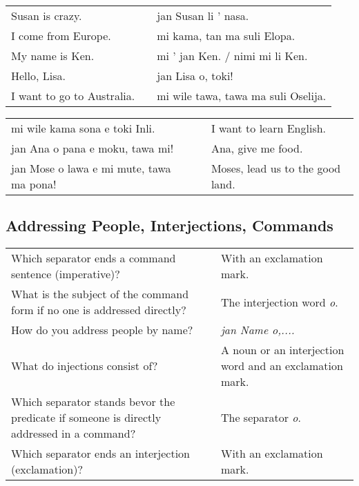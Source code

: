 \begin{supertabular}{p{5,5cm}|ll}
    Susan is crazy.            &  & jan Susan li ' nasa.                \\
    I come from Europe.        &  & mi kama, tan ma suli Elopa.         \\
    My name is Ken.            &  & mi ' jan Ken. / nimi mi li Ken.     \\
    Hello, Lisa.               &  & jan Lisa o, toki!                   \\
    I want to go to Australia. &  & mi wile tawa, tawa ma suli Oselija. \\
\end{supertabular}

\begin{supertabular}{p{5,5cm}|ll}
    mi wile kama sona e toki Inli.           &  & I want to learn English.         \\
    jan Ana o pana e moku, tawa mi!          &  & Ana, give me food.               \\
    jan Mose o lawa e mi mute, tawa ma pona! &  & Moses, lead us to the good land. \\
\end{supertabular}

\newpage

\subsection*{Addressing People, Interjections, Commands}
\label{'commands_interjections'}

\begin{supertabular}{p{5,5cm}|ll}
    Which separator ends a command sentence (imperative)?                                      &  & With an exclamation mark.                               \\
    What is the subject of the command form if no one is addressed directly?                   &  & The interjection word \textit{o}.                       \\
    How do you address people by name?                                                         &  & \textit{jan Name o,.... }                               \\
    What do injections consist of?                                                             &  & A noun or an interjection word and an exclamation mark. \\
    Which separator stands bevor  the predicate if someone is directly addressed in a command? &  & The separator \textit{o}.                               \\
    Which separator ends an interjection (exclamation)?                                        &  & With an exclamation mark.                               \\
\end{supertabular}


